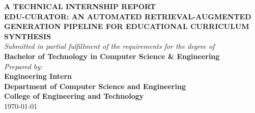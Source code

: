 \documentclass[12pt,a4paper]{article}
\begin{document}
\begin{titlepage}
\centering
\vspace*{2cm}
{\large \textbf{A TECHNICAL INTERNSHIP REPORT}} \\[0.8cm]
{\Large \textbf{EDU-CURATOR: AN AUTOMATED RETRIEVAL-AUGMENTED GENERATION PIPELINE FOR EDUCATIONAL CURRICULUM SYNTHESIS}} \\[1.5cm]
\textit{Submitted in partial fulfillment of the requirements for the degree of}\\[0.3cm]
\textbf{Bachelor of Technology in Computer Science \& Engineering}\\[2cm]
\textit{Prepared by:}\\[0.2cm]
\textbf{Engineering Intern}\\[3cm]
\textbf{Department of Computer Science and Engineering}\\
\textbf{College of Engineering and Technology}\\[1cm]
\today
\end{titlepage}

\newpage
{}
\end{document}
